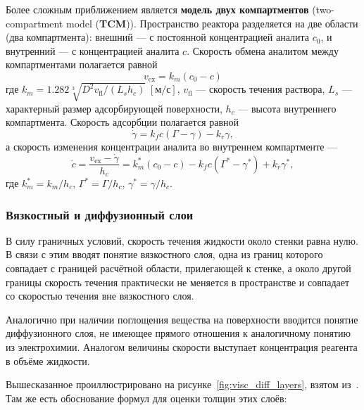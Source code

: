 \documentclass[oneside,final,12pt]{extreport}
\begin{document}
Более сложным приближением является \textbf{модель двух компартментов}
(two-compartment model (\textbf{TCM}))\cite{bib:TCM}.
Пространство реактора разделяется на две области (два компартмента):
внешний --- с постоянной концентрацией аналита $c_0$, и
внутренний --- с концентрацией аналита $c$.
Скорость обмена аналитом между компартментами полагается равной
\begin{equation}
  v_\text{ex} = k_m \left(c_0 - c\right)
\label{eq:TCM:exchange}
\end{equation}
где $k_m = 1.282\sqrt[3]{D^2 v_\text{fl} / \left(L_s h_c\right)}\;
  \left[\text{м}/\text{с}\right]$, 
$v_\text{fl}$ --- скорость течения раствора,
$L_s$ --- характерный размер адсорбирующей поверхности,
$h_c$ --- высота внутреннего компартмента.
Скорость адсорбции полагается равной
\begin{equation}
  \dot{\gamma} = k_f c \left(\Gamma - \gamma\right) - k_r\gamma,
\label{eq:TCM:adsorption}
\end{equation}
а скорость изменения концентрации аналита во внутреннем компартменте ---
\begin{equation}
  \dot{c} = \frac{v_\text{ex} - \dot{\gamma}}{h_c} =
            k_m^* \left(c_0 - c\right) - k_f c \left(\Gamma^* - \gamma^*\right) + k_r \gamma^*,
\label{eq:TCM:inner}
\end{equation}
где $k_m^* = k_m/h_c$, $\Gamma^* = \Gamma/h_c$, $\gamma^* = \gamma/h_c$.

\subsubsection*{Вязкостный и диффузионный слои}
В силу граничных условий, скорость течения жидкости около стенки равна нулю.
В связи с этим вводят понятие вязкостного слоя, одна из границ которого
совпадает с границей расчётной области, прилегающей к стенке,
а около другой границы скорость течения практически не меняется в пространстве
и совпадает со скоростью течения вне вязкостного слоя.

Аналогично при наличии поглощения вещества на поверхности вводится понятие
диффузионного слоя, не имеющее прямого отношения к аналогичному понятию из
электрохимии.
Аналогом величины скорости выступает концентрация реагента в объёме жидкости.

Вышесказанное проиллюстрировано на рисунке~\ref{fig:visc_diff_layers},
взятом из~\cite{bib:phys_chem_hydro_layers}.
Там же есть обоснование формул для оценки толщин этих слоёв:
\end{document}
